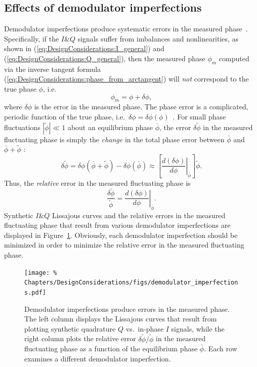 \subsection{Effects of demodulator imperfections}
\label{sec:DesignConsiderations:demodulation:imperfection_implications}
Demodulator imperfections produce systematic errors
in the measured phase~\cite{vanzeeland_rsi04,kasten_masters}.
Specifically, if the $I\&Q$ signals suffer from imbalances and nonlinearities,
as shown in (\ref{eq:DesignConsiderations:I_general}) and
(\ref{eq:DesignConsiderations:Q_general}),
then the measured phase $\phi_m$ computed via the inverse tangent formula
(\ref{eq:DesignConsiderations:phase_from_arctangent})
will \emph{not} correspond to the true phase $\phi$, i.e.\
\begin{equation}
  \phi_m = \phi + \delta \phi,
\end{equation}
where $\delta\phi$ is the error in the measured phase.
The phase error is a complicated, periodic function of the true phase,
i.e.\ $\delta\phi = \delta\phi(\phi)$~\cite{vanzeeland_rsi04}.
For small phase fluctuations $|\tilde{\phi}| \ll 1$
about an equilibrium phase $\bar{\phi}$,
the error $\delta\tilde{\phi}$ in the measured fluctuating phase
is simply the \emph{change} in the total phase error
between $\bar{\phi}$ and $\bar{\phi} + \tilde{\phi}$
\cite{kasten_masters}:
\begin{equation}
  \delta\tilde{\phi}
  =
  \delta\phi(\bar{\phi} + \tilde{\phi}) - \delta\phi(\bar{\phi})
  \approx
  \left[%
    \left. \frac{d(\delta\phi)}{d\phi} \right|_{\bar{\phi}}
  \right] \tilde{\phi}.
\end{equation}
Thus, the \emph{relative} error in the measured fluctuating phase is
\begin{equation}
  \frac{\delta\tilde{\phi}}{\tilde{\phi}}
  =
  \left. \frac{d(\delta\phi)}{d\phi} \right|_{\bar{\phi}}.
  \label{eq:DesignConsiderations:relative_fluctuation_error}
\end{equation}
Synthetic $I\&Q$ Lissajous curves and
the relative errors in the measured fluctuating phase
that result from various demodulator imperfections
are displayed in
Figure~\ref{fig:DesignConsiderations:effects_of_demodulator_imperfections}.
Obviously, each demodulator imperfection should be minimized
in order to minimize the relative error
in the measured fluctuating phase.

\begin{figure}
  \centering
  \texttt{[image: \%
    Chapters/DesignConsiderations/figs/demodulator\_imperfections.pdf]}
  \caption[Effects of demodulator imperfections]{%
    Demodulator imperfections produce errors in the measured phase.
    The left column displays the Lissajous curves
    that result from plotting
    synthetic quadrature $Q$ vs.\ in-phase $I$ signals, while
    the right column plots the relative error
    $\delta\tilde{\phi} / \tilde{\phi}$
    in the measured fluctuating phase
    as a function of the equilibrium phase $\bar{\phi}$.
    Each row examines a different demodulator imperfection.
  }
  \label{fig:DesignConsiderations:effects_of_demodulator_imperfections}
\end{figure}



